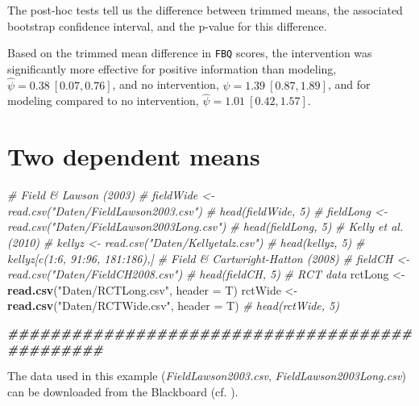 \documentclass[
]{article}
\newenvironment{Shaded}{\begin{snugshade}}{\end{snugshade}}
\newcommand{\AttributeTok}[1]{\textcolor[rgb]{0.13,0.29,0.53}{#1}}
\newcommand{\CommentTok}[1]{\textcolor[rgb]{0.56,0.35,0.01}{\textit{#1}}}
\newcommand{\DocumentationTok}[1]{\textcolor[rgb]{0.56,0.35,0.01}{\textbf{\textit{#1}}}}
\newcommand{\FunctionTok}[1]{\textcolor[rgb]{0.13,0.29,0.53}{\textbf{#1}}}
\newcommand{\NormalTok}[1]{#1}
\newcommand{\OtherTok}[1]{\textcolor[rgb]{0.56,0.35,0.01}{#1}}
\newcommand{\StringTok}[1]{\textcolor[rgb]{0.31,0.60,0.02}{#1}}
\begin{document}
The post-hoc tests tell us the difference between trimmed means, the associated bootstrap confidence interval, and the p-value for this difference.

Based on the trimmed mean difference in \texttt{FBQ} scores, the intervention was significantly more effective for positive information than modeling, \(\hat{\psi} = 0.38 \  [0.07, 0.76]\), and no intervention, \(\hat{\psi} = 1.39  \ [0.87, 1.89]\), and for modeling compared to no intervention, \(\hat{\psi} = 1.01 \ [0.42, 1.57]\).

\section*{Two dependent means}\label{two-dependent-means}

\begin{Shaded}
\begin{Highlighting}[]
  \CommentTok{\# Field \& Lawson (2003)}
    \CommentTok{\# fieldWide \textless{}{-} read.csv("Daten/FieldLawson2003.csv")}
    \CommentTok{\# head(fieldWide, 5) }
    \CommentTok{\# fieldLong \textless{}{-} read.csv("Daten/FieldLawson2003Long.csv")}
    \CommentTok{\# head(fieldLong, 5)}
  \CommentTok{\# Kelly et al. (2010)}
    \CommentTok{\# kellyz \textless{}{-} read.csv("Daten/Kellyetalz.csv")}
    \CommentTok{\# head(kellyz, 5) }
    \CommentTok{\# kellyz[c(1:6, 91:96, 181:186),]}
  \CommentTok{\# Field \& Cartwright{-}Hatton (2008)}
    \CommentTok{\# fieldCH \textless{}{-} read.csv("Daten/FieldCH2008.csv")}
    \CommentTok{\# head(fieldCH, 5)}
  \CommentTok{\# RCT data}
\NormalTok{    rctLong }\OtherTok{\textless{}{-}} \FunctionTok{read.csv}\NormalTok{(}\StringTok{"Daten/RCTLong.csv"}\NormalTok{, }\AttributeTok{header =}\NormalTok{ T)}
\NormalTok{    rctWide }\OtherTok{\textless{}{-}} \FunctionTok{read.csv}\NormalTok{(}\StringTok{"Daten/RCTWide.csv"}\NormalTok{, }\AttributeTok{header =}\NormalTok{ T) }
    \CommentTok{\# head(rctWide, 5)}

    \DocumentationTok{\#\#\#\#\#\#\#\#\#\#\#\#\#\#\#\#\#\#\#\#\#\#\#\#\#\#\#\#\#\#\#\#\#\#\#\#\#\#\#\#\#\#\#\#\#\#\#}
\end{Highlighting}
\end{Shaded}

The data used in this example (\emph{FieldLawson2003.csv}, \emph{FieldLawson2003Long.csv}) can be downloaded from the Blackboard (cf. ).
\end{document}

